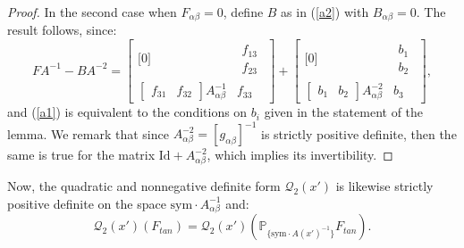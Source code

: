 \documentclass[leqno,twoside, 11pt]{amsart}
\theoremstyle{plain}
\theoremstyle{definition}
\numberwithin{equation}{section}
\numberwithin{figure}{section}
\begin{document}
\begin{proof}
In the second case when $F_{\alpha\beta}=0$, define $B$ as in 
(\ref{a2}) with $B_{\alpha\beta}=0$. The result follows, since:
$$FA^{-1} - BA^{-2} = \left[\begin{array}{cc} 
\Big[ 0 \Big]
& \begin{array}{c} f_{13}\\ f_{23}\end{array}\\
\left[\begin{array}{cc} f_{31} &  f_{32} \end{array}\right] A_{\alpha\beta}^{-1}
& f_{33} \end{array}\right] +
\left[\begin{array}{cc} 
\Big[ 0 \Big]
& \begin{array}{c} b_{1}\\ b_{2}\end{array}\\
\left[\begin{array}{cc} b_{1} &  b_{2} \end{array}\right] A_{\alpha\beta}^{-2}
& b_{3} \end{array}\right],$$
and (\ref{a1}) is equivalent to the conditions on $b_i$ given in the statement 
of the lemma. We remark that since $A_{\alpha\beta}^{-2}= [g_{\alpha\beta}]^{-1}$
is strictly positive definite, then the same is true for the
matrix $\mbox{Id} + A_{\alpha\beta}^{-2}$, which implies its invertibility.
\end{proof}

Now, the quadratic and nonnegative definite form $\mathcal{Q}_2(x')$
is likewise strictly positive definite on the space
$\mbox{sym}\cdot A_{\alpha\beta}^{-1}$ and:
\begin{equation}\label{r2}
\mathcal{Q}_2(x')(F_{tan}) 
= \mathcal{Q}_2(x')\left(\mathbb{P}_{\{\mbox{sym}\cdot A(x')^{-1}\}} F_{tan}\right).
\end{equation}
\end{document}
